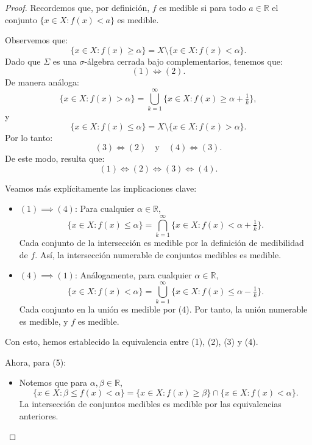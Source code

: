 \begin{proof}
    Recordemos que, por definición, $f$ es medible si para todo $a \in \mathbb{R}$ el conjunto $\{x \in X : f(x) < a\}$ es medible.

    Observemos que:
    \[
        \{x \in X : f(x) \geq \alpha\} = X \setminus \{x \in X : f(x) < \alpha\}.
    \]
    Dado que $\Sigma$ es una $\sigma$-álgebra cerrada bajo complementarios, tenemos
    que:
    \[
        (1) \iff (2).
    \]
    De manera análoga:
    \[
        \{x \in X : f(x) > \alpha\} = \bigcup_{k=1}^{\infty} \{x \in X : f(x) \geq \alpha + \tfrac{1}{k}\},
    \]
    y
    \[
        \{x \in X : f(x) \leq \alpha\} = X \setminus \{x \in X : f(x) > \alpha\}.
    \]
    Por lo tanto:
    \[
        (3) \iff (2) \quad \text{y} \quad (4) \iff (3).
    \]
    De este modo, resulta que:
    \[
        (1) \iff (2) \iff (3) \iff (4).
    \]

    Veamos más explícitamente las implicaciones clave:

    \begin{itemize}
        \item $(1) \implies (4)$:
              Para cualquier $\alpha \in \mathbb{R}$,
              \[
                  \{x \in X : f(x) \leq \alpha\} = \bigcap_{k=1}^{\infty} \{x \in X : f(x) < \alpha + \tfrac{1}{k}\}.
              \]
              Cada conjunto de la intersección es medible por la definición de medibilidad de
              $f$. Así, la intersección numerable de conjuntos medibles es medible.

        \item $(4) \implies (1)$:
              Análogamente, para cualquier $\alpha \in \mathbb{R}$,
              \[
                  \{x \in X : f(x) < \alpha\} = \bigcup_{k=1}^{\infty} \{x \in X : f(x) \leq \alpha - \tfrac{1}{k}\}.
              \]
              Cada conjunto en la unión es medible por (4). Por tanto, la unión numerable es
              medible, y $f$ es medible.
    \end{itemize}

    Con esto, hemos establecido la equivalencia entre (1), (2), (3) y (4).

    Ahora, para (5):
    \begin{itemize}
        \item Notemos que para $\alpha, \beta \in \mathbb{R}$,
              \[
                  \{x \in X : \beta \leq f(x) < \alpha\} = \{x \in X : f(x) \geq \beta\} \cap \{x \in X : f(x) < \alpha\}.
              \]
              La intersección de conjuntos medibles es medible por las equivalencias
              anteriores.


\end{itemize}
\end{proof}
